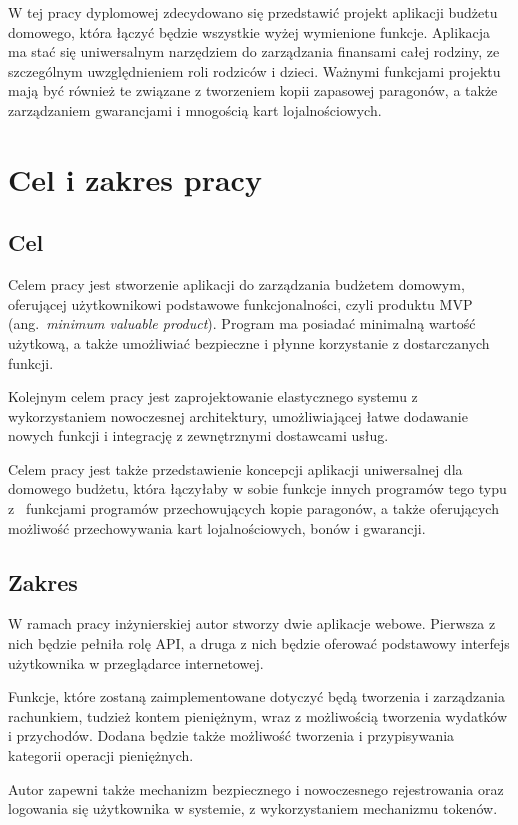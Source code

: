W tej pracy dyplomowej zdecydowano się przedstawić projekt aplikacji budżetu domowego, która łączyć będzie wszystkie wyżej wymienione funkcje. Aplikacja ma stać się uniwersalnym narzędziem do zarządzania finansami całej rodziny, ze szczególnym uwzględnieniem roli rodziców i dzieci. Ważnymi funkcjami projektu mają być również te związane z tworzeniem kopii zapasowej paragonów, a także zarządzaniem gwarancjami i mnogością kart lojalnościowych.

\section{Cel i zakres pracy}
\label{sec:cel-zakres}
\subsection{Cel}
\label{subsec:cel}
Celem pracy jest stworzenie aplikacji do zarządzania budżetem domowym, oferującej użytkownikowi podstawowe funkcjonalności, czyli produktu MVP (ang.~\emph{minimum valuable product}). Program ma posiadać minimalną wartość użytkową, a także umożliwiać bezpieczne i płynne korzystanie z dostarczanych funkcji.  

Kolejnym celem pracy jest zaprojektowanie elastycznego systemu z wykorzystaniem nowoczesnej architektury, umożliwiającej łatwe dodawanie nowych funkcji i integrację z zewnętrznymi dostawcami usług.

Celem pracy jest także przedstawienie koncepcji aplikacji uniwersalnej dla domowego budżetu, która łączyłaby w sobie funkcje innych programów tego typu z~ funkcjami programów przechowujących kopie paragonów, a także oferujących możliwość przechowywania kart lojalnościowych, bonów i gwarancji.

\subsection{Zakres}
\label{subsec:zakres}
W ramach pracy inżynierskiej autor stworzy dwie aplikacje webowe. Pierwsza z nich będzie pełniła rolę API, a druga z nich będzie oferować podstawowy interfejs użytkownika w przeglądarce internetowej.

Funkcje, które zostaną zaimplementowane dotyczyć będą tworzenia i zarządzania  rachunkiem, tudzież kontem pieniężnym, wraz z możliwością tworzenia wydatków i przychodów. Dodana będzie także możliwość tworzenia i przypisywania kategorii operacji pieniężnych.

Autor zapewni także mechanizm bezpiecznego i nowoczesnego rejestrowania oraz logowania się użytkownika w systemie, z wykorzystaniem mechanizmu tokenów.

